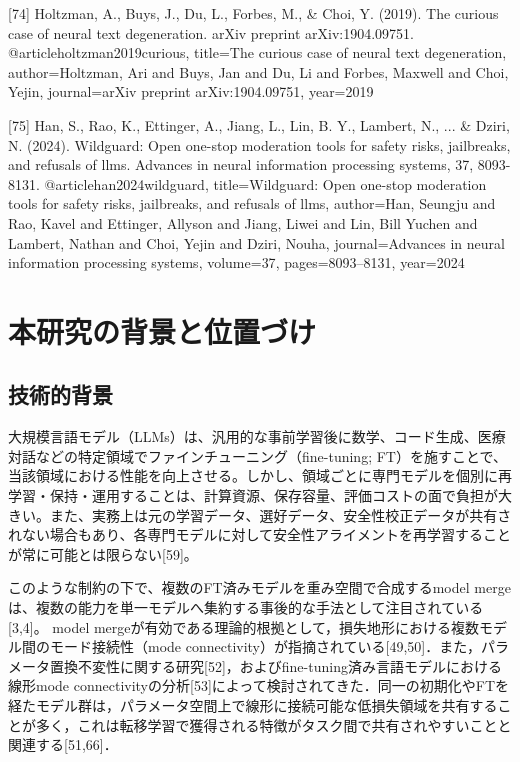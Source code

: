 \documentclass{article}
\begin{document}
{[74] Holtzman, A., Buys, J., Du, L., Forbes, M., & Choi, Y. (2019). The curious case of neural text degeneration. arXiv preprint arXiv:1904.09751.
@article{holtzman2019curious,
  title={The curious case of neural text degeneration},
  author={Holtzman, Ari and Buys, Jan and Du, Li and Forbes, Maxwell and Choi, Yejin},
  journal={arXiv preprint arXiv:1904.09751},
  year={2019}
}

[75] Han, S., Rao, K., Ettinger, A., Jiang, L., Lin, B. Y., Lambert, N., ... & Dziri, N. (2024). Wildguard: Open one-stop moderation tools for safety risks, jailbreaks, and refusals of llms. Advances in neural information processing systems, 37, 8093-8131.
@article{han2024wildguard,
  title={Wildguard: Open one-stop moderation tools for safety risks, jailbreaks, and refusals of llms},
  author={Han, Seungju and Rao, Kavel and Ettinger, Allyson and Jiang, Liwei and Lin, Bill Yuchen and Lambert, Nathan and Choi, Yejin and Dziri, Nouha},
  journal={Advances in neural information processing systems},
  volume={37},
  pages={8093--8131},
  year={2024}
}
}


\newpage
\appendix

\section{本研究の背景と位置づけ}
\label{app:本研究の背景と定式化上の位置づけ}

\subsection{技術的背景}
大規模言語モデル（LLMs）は、汎用的な事前学習後に数学、コード生成、医療対話などの特定領域でファインチューニング（fine-tuning; FT）を施すことで、当該領域における性能を向上させる。しかし、領域ごとに専門モデルを個別に再学習・保持・運用することは、計算資源、保存容量、評価コストの面で負担が大きい。また、実務上は元の学習データ、選好データ、安全性校正データが共有されない場合もあり、各専門モデルに対して安全性アライメントを再学習することが常に可能とは限らない[59]。

このような制約の下で、複数のFT済みモデルを重み空間で合成するmodel mergeは、複数の能力を単一モデルへ集約する事後的な手法として注目されている[3,4]。
\color{red}
model mergeが有効である理論的根拠として，損失地形における複数モデル間のモード接続性（mode connectivity）が指摘されている[49,50]．また，パラメータ置換不変性に関する研究[52]，およびfine-tuning済み言語モデルにおける線形mode connectivityの分析[53]によって検討されてきた．同一の初期化やFTを経たモデル群は，パラメータ空間上で線形に接続可能な低損失領域を共有することが多く，これは転移学習で獲得される特徴がタスク間で共有されやすいことと関連する[51,66]．
\end{document}
